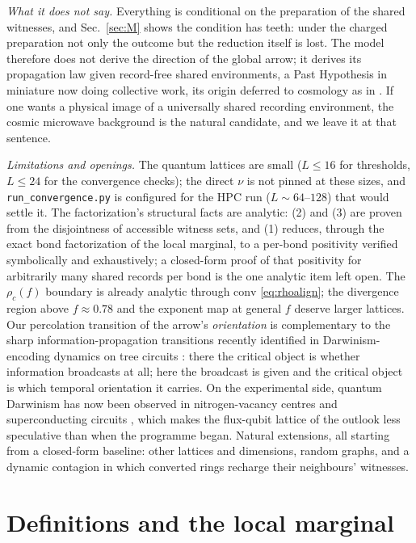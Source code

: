 \documentclass[11pt]{article}
\newcommand{\conv}{\mathrm{conv}}
\begin{document}
\emph{What it does not say.} Everything is conditional on the preparation
of the shared witnesses, and Sec.~\ref{sec:M} shows the condition has
teeth: under the charged preparation not only the outcome but the reduction
itself is lost. The model therefore does not derive the direction of the
global arrow; it derives its propagation law given record-free shared
environments, a Past Hypothesis in miniature now doing collective work, its origin deferred to cosmology as in
\cite{p1,p2,halliwell,alkhalili}. If one wants a
physical image of a universally shared recording environment, the cosmic
microwave background is the natural candidate, and we leave it at that
sentence.

\emph{Limitations and openings.} The quantum lattices are small
($L \le 16$ for thresholds, $L \le 24$ for the convergence checks); the
direct $\nu$ is not pinned at these sizes, and \texttt{run\_convergence.py}
is configured for the HPC run ($L \sim 64$--$128$) that would settle it.
The factorization's structural facts are analytic: (2) and (3) are proven
from the disjointness of accessible witness sets, and (1) reduces, through
the exact bond factorization of the local marginal, to a per-bond
positivity verified symbolically and exhaustively; a closed-form proof of
that positivity for arbitrarily many shared records per bond is the one
analytic item left open. The
$\rho_c(f)$ boundary is already analytic through $\conv$
\eqref{eq:rhoalign}; the divergence region above $f \approx 0.78$ and the
exponent map at general $f$ deserve larger lattices. Our percolation
transition of the arrow's \emph{orientation} is complementary to the sharp
information-propagation transitions recently identified in
Darwinism-encoding dynamics on tree circuits \cite{fertecao}: there the
critical object is whether information broadcasts at all; here the
broadcast is given and the critical object is which temporal orientation it
carries. On the experimental side, quantum Darwinism has now been
observed in nitrogen-vacancy centres \cite{unden} and superconducting
circuits \cite{zhu}, which makes the flux-qubit \cite{friedman} lattice of
the outlook less speculative than when the programme began. Natural
extensions, all starting from a closed-form baseline: other lattices and
dimensions, random graphs, and a dynamic contagion in which converted rings
recharge their neighbours' witnesses.

\appendix

\section{Definitions and the local marginal}
\end{document}
